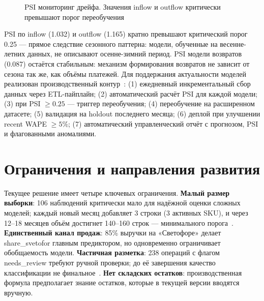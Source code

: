 \begin{figure}[H]
\centering
{}
\caption{PSI мониторинг дрейфа. Значения inflow и outflow критически превышают порог переобучения}
\label{fig:psi_chart}
\end{figure}

PSI по inflow (1.032) и outflow (1.165) кратно превышают критический порог 0.25 --- прямое следствие сезонного паттерна: модели, обученные на весенне-летних данных, не описывают осенне-зимний период. PSI модели возвратов (0.087) остаётся стабильным: механизм формирования возвратов не зависит от сезона так же, как объёмы платежей. Для поддержания актуальности моделей реализован производственный контур~\cite{sculley2015hidden}: (1) ежедневный инкрементальный сбор данных через ETL-пайплайн; (2) автоматический расчёт PSI для каждой модели; (3) при PSI $\ge 0.25$ --- триггер переобучения; (4) переобучение на расширенном датасете; (5) валидация на holdout последнего месяца; (6) деплой при улучшении recent WAPE $\ge 5\%$; (7) автоматический управленческий отчёт с прогнозом, PSI и флагованными аномалиями.

\section{Ограничения и направления развития}

Текущее решение имеет четыре ключевых ограничения. \textbf{Малый размер выборки}: 106 наблюдений критически мало для надёжной оценки сложных моделей; каждый новый месяц добавляет 3 строки (3 активных SKU), и через 12--18 месяцев объём достигнет 140--160 строк --- минимального порога~\cite{makridakis2018m4}. \textbf{Единственный канал продаж}: 85\% выручки на «Светофоре» делает share\_svetofor главным предиктором, но одновременно ограничивает обобщаемость модели. \textbf{Частичная разметка}: 238 операций с флагом needs\_review требуют ручной проверки; до её завершения качество классификации не финальное~\cite{kaufman2012leakage}. \textbf{Нет складских остатков}: производственная формула предполагает знание остатков, которые в текущей версии вводятся вручную.

